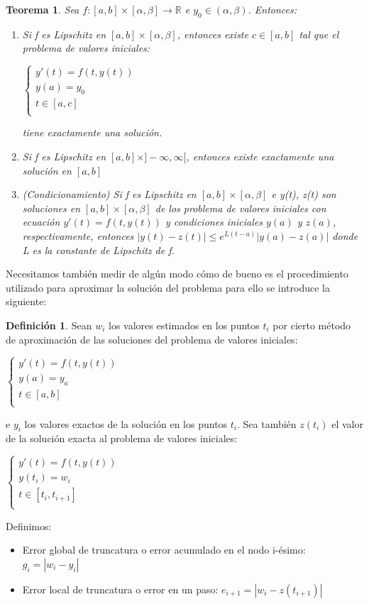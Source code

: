 \documentclass{article}
\theoremstyle{theorem-style}  %
\newtheorem{theorem}{Teorema}[section]  %
\theoremstyle{definition}
\newtheorem{definition}{Definición}[section]
\theoremstyle{example-style}
\begin{document}
	\begin{theorem}
		Sea $f: [a,b]\times[\alpha,\beta] \rightarrow \mathbb{R}$ e $y_0 \in (\alpha,\beta)$. Entonces:
		\begin{enumerate}
			\item Si f es Lipschitz en $[a,b]\times[\alpha,\beta]$, entonces existe $c \in [a,b]$ tal que el problema de valores iniciales:
			\begin{center}
				$\begin{cases}
				y'(t) = f(t,y(t)) \\
				y(a) = y_0 \\
				t \in [a,c] \\
				\end{cases}$
			\end{center}
			tiene exactamente una solución. 
			\item Si f es Lipschitz en $[a,b]\times]-\infty,\infty[$, entonces existe exactamente una solución en $[a,b]$
			\item (Condicionamiento) Si f es Lipschitz en $[a,b]\times[\alpha,\beta]$ e y(t), z(t) son soluciones en $[a,b]\times[\alpha,\beta]$ de los problema de valores iniciales con ecuación $y'(t) = f(t,y(t))$ y condiciones iniciales $y(a)$ y $z(a)$, respectivamente, entonces $|y(t)-z(t)| \leq e^{L(t-a)}|y(a)-z(a)|$ donde L es la constante de Lipschitz de f.
		\end{enumerate}
	\end{theorem}
	
	Necesitamos también medir de algún modo cómo de bueno es el procedimiento utilizado para aproximar la solución del problema para ello se introduce la siguiente:
	
	\begin{definition} Sean $w_i$ los valores estimados en los puntos $t_i$ por cierto método de aproximación de las soluciones del problema de valores iniciales:
	\begin{center}
	$\begin{cases}
	y'(t) = f(t,y(t)) \\
	y(a) = y_a \\
	t \in [a,b] \\
	\end{cases}$
	\end{center}
	e $y_i$ los valores exactos de la solución en los puntos $t_i$. Sea también $z(t_i)$ el valor de la solución exacta al problema de valores iniciales:
	\begin{center}
	$\begin{cases}
	y'(t) = f(t,y(t)) \\
	y(t_i) = w_i \\
	t \in [t_i,t_{i+1}] \\
	\end{cases}$
	\end{center}
	Definimos:
	\begin{itemize}
	\item Error global de truncatura o error acumulado en el nodo i-ésimo: $g_i=|w_i-y_i|$
	\item Error local de truncatura o error en un paso: $e_{i+1} = |w_i-z(t_{i+1})|$
	\end{itemize} 
	\end{definition}
	
\end{document}
